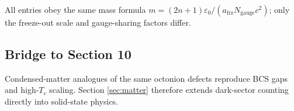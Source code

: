 All entries obey the same mass formula
$m=(2n+1)\varepsilon_{0}/(a_{\text{frz}}N_{\text{gauge}}c^{2})$;
only the freeze-out scale and gauge-sharing factors differ.

\subsection{Bridge to Section 10}

Condensed‐matter analogues of the same octonion defects reproduce BCS
gaps and high-$T_c$ scaling.  Section \ref{sec:matter} therefore extends
dark-sector counting directly into solid-state physics.

\clearpage
